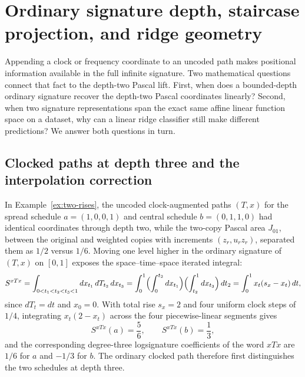 \section{Ordinary signature depth, staircase projection, and ridge geometry}
\label{app:depth-and-ridge}

Appending a clock or frequency coordinate to an uncoded path makes positional
information available in the full infinite signature. Two mathematical questions
connect that fact to the depth-two Pascal lift. First, when does a bounded-depth
ordinary signature recover the depth-two Pascal coordinates linearly? Second,
when two signature representations span the exact same affine linear function
space on a dataset, why can a linear ridge classifier still make different
predictions? We answer both questions in turn.

\subsection{Clocked paths at depth three and the interpolation correction}
In Example~\ref{ex:two-rises}, the uncoded clock-augmented paths \((T, x)\) for
the spread schedule \(a = (1, 0, 0, 1)\) and central schedule \(b = (0, 1, 1, 0)\)
had identical coordinates through depth two, while the two-copy Pascal area
\(J_{01}\), between the original and weighted copies with increments
\((z_r,u_r z_r)\), separated them as \(1/2\) versus \(1/6\). Moving one level higher
in the ordinary signature of \((T, x)\) on \([0, 1]\) exposes the space--time--space
iterated integral:
\[
 S^{xTx} = \int_{0 < t_1 < t_2 < t_3 < 1} dx_{t_1}\,dT_{t_2}\,dx_{t_3}
         = \int_0^1 \Bigl(\int_0^{t_2} dx_{t_1}\Bigr)\Bigl(\int_{t_2}^1 dx_{t_3}\Bigr)\,dt_2
         = \int_0^1 x_t (s_x - x_t)\,dt,
\]
since \(dT_t = dt\) and \(x_0 = 0\). With total rise \(s_x = 2\) and four uniform
clock steps of \(1/4\), integrating \(x_t(2 - x_t)\) across the four piecewise-linear
segments gives
\[
 S^{xTx}(a) = \frac{5}{6}, \qquad S^{xTx}(b) = \frac{1}{3},
\]
and the corresponding degree-three logsignature coefficients of the word \(xTx\)
are \(1/6\) for \(a\) and \(-1/3\) for \(b\). The ordinary clocked path therefore
first distinguishes the two schedules at depth three.

